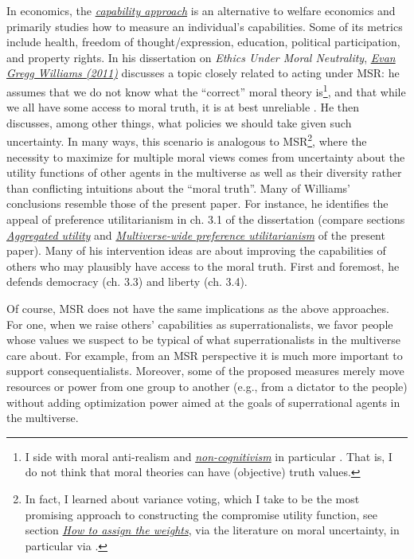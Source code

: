 In economics, the
\href{https://en.wikipedia.org/wiki/Capability_approach}{\emph{capability
approach}} is an alternative to welfare economics and primarily studies
how to measure an individual's capabilities. Some of its metrics include
health, freedom of thought/expression, education, political
participation, and property rights. In his dissertation on \emph{Ethics
Under Moral Neutrality},
\href{https://rucore.libraries.rutgers.edu/rutgers-lib/34078/pdf/1/}{\emph{Evan
Gregg Williams (2011)}} discusses a topic closely related to acting
under MSR: he assumes that we do not know what the ``correct'' moral
theory is\footnote{\label{non-cognitivism} I side with moral anti-realism
  \parencite{Joyce2016-no} and
  \href{https://en.wikipedia.org/wiki/Non-cognitivism}{\emph{non-cognitivism}}
  in particular \parencite{Joyce2016-no}. That is, I do not
  think that moral theories can have (objective) truth values.}, and
that while we all have some access to moral truth, it is at best
unreliable \parencite{Williams2011-ul}. He then discusses,
among other things, what policies we should take given such uncertainty.
In many ways, this scenario is analogous to MSR\footnote{In fact, I
  learned about variance voting, which I take to be the most promising
  approach to constructing the compromise utility function, see section
  \protect\hyperlink{how-to-assign-the-weights}{\emph{How to assign
  the weights}}, via the literature on moral uncertainty, in
  particular via \parencite{MacAskill2014-ca}.}, where the
necessity to maximize for multiple moral views comes from uncertainty
about the utility functions of other agents in the multiverse as well as
their diversity rather than conflicting intuitions about the ``moral
truth''. Many of Williams' conclusions resemble those of the present
paper. For instance, he identifies the appeal of preference
utilitarianism in ch. 3.1 of the dissertation (compare sections
\protect\hyperlink{_2uwv44pwn55u}{\emph{Aggregated utility}} and
\protect\hyperlink{multiverse-wide-preference-utilitarianism}{\emph{Multiverse-wide
preference utilitarianism}} of the present paper). Many of his
intervention ideas are about improving the capabilities of others who
may plausibly have access to the moral truth. First and foremost, he
defends democracy (ch. 3.3) and liberty (ch. 3.4).

Of course, MSR does not have the same implications as the above
approaches. For one, when we raise others' capabilities as
superrationalists, we favor people whose values we suspect to be typical
of what superrationalists in the multiverse care about. For example,
from an MSR perspective it is much more important to support
consequentialists. Moreover, some of the proposed measures merely move
resources or power from one group to another (e.g., from a dictator to
the people) without adding optimization power aimed at the goals of
superrational agents in the multiverse.

